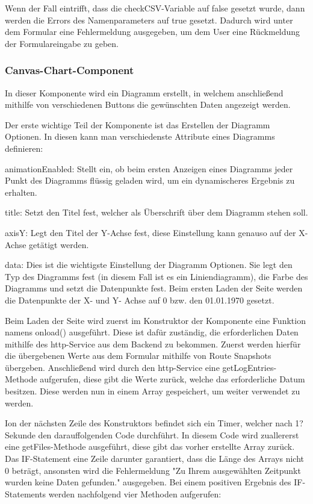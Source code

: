 Wenn der Fall eintrifft, dass die checkCSV-Variable auf false gesetzt wurde, dann werden die Errors des Namenparameters auf true gesetzt. Dadurch wird unter dem Formular eine Fehlermeldung ausgegeben, um dem User eine Rückmeldung der Formulareingabe zu geben.

\subsubsection{Canvas-Chart-Component}

In dieser Komponente wird ein Diagramm erstellt, in welchem anschließend mithilfe von verschiedenen Buttons die gewünschten Daten angezeigt werden.  

Der erste wichtige Teil der Komponente ist das Erstellen der Diagramm Optionen. In diesen kann man verschiedenste Attribute eines Diagramms definieren: 

\begin{compactitem}
    \item animationEnabled: Stellt ein, ob beim ersten Anzeigen eines Diagramms jeder Punkt des Diagramms flüssig geladen wird, um ein dynamischeres Ergebnis zu erhalten.    
    \item title: Setzt den Titel fest, welcher als Überschrift über dem Diagramm stehen soll.          
    \item axisY: Legt den Titel der Y-Achse fest, diese Einstellung kann genauso auf der X-Achse getätigt werden.    
    \item data: Dies ist die wichtigste Einstellung der Diagramm Optionen. Sie legt den Typ des Diagramms fest (in diesem Fall ist es ein Liniendiagramm), die Farbe des Diagramms und setzt die Datenpunkte fest. Beim ersten Laden der Seite werden die Datenpunkte der X- und Y- Achse auf 0 bzw. den 01.01.1970 gesetzt. 
\end{compactitem}

Beim Laden der Seite wird zuerst im Konstruktor der Komponente eine Funktion namens onload() ausgeführt. Diese ist dafür zuständig, die erforderlichen Daten mithilfe des http-Service aus dem Backend zu bekommen. Zuerst werden hierfür die übergebenen Werte aus dem Formular mithilfe von Route Snapshots übergeben. Anschließend wird durch den http-Service eine getLogEntries-Methode aufgerufen, diese gibt die Werte zurück, welche das erforderliche Datum besitzen. Diese werden nun in einem Array gespeichert, um weiter verwendet zu werden.

Ion der nächsten Zeile des Konstruktors befindet sich ein Timer, welcher nach 1? Sekunde den darauffolgenden Code durchführt. In diesem Code wird zuallererst eine getFiles-Methode ausgeführt, diese gibt das vorher erstellte Array zurück. Das IF-Statement eine Zeile darunter garantiert, dass die Länge des Arrays nicht 0 beträgt, ansonsten wird die Fehlermeldung "Zu Ihrem ausgewählten Zeitpunkt wurden keine Daten gefunden." ausgegeben. Bei einem positiven Ergebnis des IF-Statements werden nachfolgend vier Methoden aufgerufen: 

